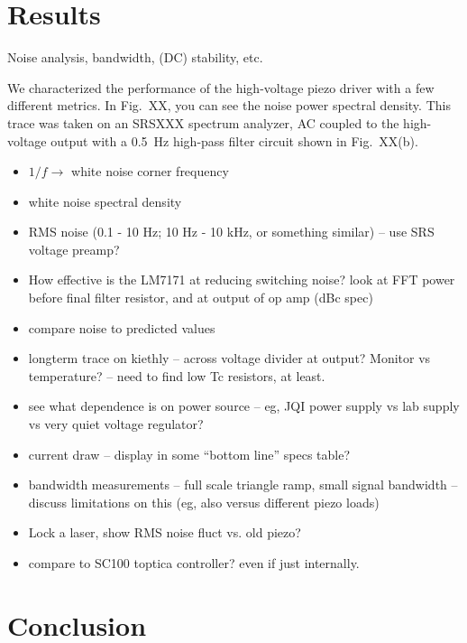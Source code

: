\documentclass[aip,rsi,reprint]{revtex4-1} %
\begin{document}
\section{Results}
\label{Sec:Results}
Noise analysis, bandwidth, (DC) stability, etc.

We characterized the performance of the high-voltage piezo driver with a few different metrics.
In Fig.~XX, you can see the noise power spectral density.
This trace was taken on an SRSXXX spectrum analyzer, AC coupled to the high-voltage output with a \SI{0.5}{\hertz} high-pass filter circuit shown in Fig.~XX(b).

\begin{itemize}
\item $1/f \rightarrow$ white noise corner frequency
\item white noise spectral density
\item RMS noise (0.1 - 10 Hz; 10 Hz - 10 kHz, or something similar) -- use SRS voltage preamp?
\item How effective is the LM7171 at reducing switching noise? look at FFT power before final filter resistor, and at output of op amp (dBc spec)
\item compare noise to predicted values
\item longterm trace on kiethly -- across voltage divider at output? Monitor vs temperature? -- need to find low Tc resistors, at least.
\item see what dependence is on power source -- eg, JQI power supply vs lab supply vs very quiet voltage regulator?
\item current draw -- display in some ``bottom line'' specs table?
\item bandwidth measurements -- full scale triangle ramp, small signal bandwidth -- discuss limitations on this (eg, also versus different piezo loads)
\item Lock a laser, show RMS noise fluct vs. old piezo?
\item compare to SC100 toptica controller? even if just internally.
\end{itemize}

\section{Conclusion}
\label{Sec:Conclusion}


\end{document}
